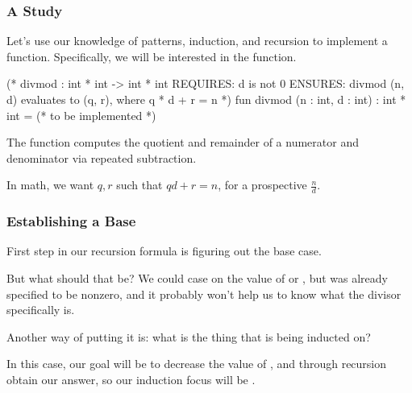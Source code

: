 \documentclass[aspectratio=169]{beamer}
\begin{document}

\begin{frame}[fragile]
  \frametitle{A  Study}

  Let's use our knowledge of patterns, induction, and recursion to implement 
  a function. Specifically, we will be interested in the  function.

  \vspace{\fill}

  \begin{codeblock}
    (* divmod : int * int -> int * int
       REQUIRES: d is not 0 
       ENSURES: divmod (n, d) evaluates to (q, r), where 
       q * d + r = n 
     *)
    fun divmod (n : int, d : int) : int * int = 
      (* to be implemented *)
  \end{codeblock}

  The  function computes the quotient and remainder of a numerator
  and denominator via repeated subtraction.

  \vspace{\fill}

  In math, we want $q, r$ such that $qd + r = n$, for a prospective $\frac{n}{d}$.
\end{frame}

\begin{frame}[fragile]
  \frametitle{Establishing a Base}

  First step in our recursion formula is figuring out the base case. 

  \vspace{\fill}

  But what should that be? We could case on the value of  or ,
  but  was already specified to be nonzero, and it probably won't help
  us to know what the divisor specifically is. 

  \vspace{\fill}

  Another way of putting it is: what is the thing that is being inducted on?

  \vspace{\fill}

  In this case, our goal will be to decrease the value of , and through 
  recursion obtain our answer, so our induction focus will be .
\end{frame}
\end{document}

